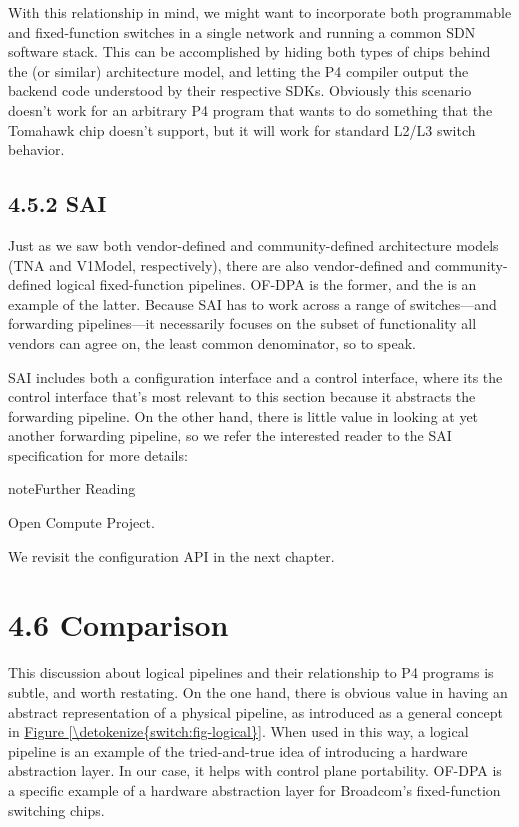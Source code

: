 \documentclass[letterpaper,11pt,english]{sphinxmanual}
\begin{document}
With this relationship in mind, we might want to incorporate both
programmable and fixed-function switches in a single network and
running a common SDN software stack. This can be accomplished by
hiding both types of chips behind the  (or similar)
architecture model, and letting the P4 compiler output the backend
code understood by their respective SDKs. Obviously this scenario
doesn’t work for an arbitrary P4 program that wants to do something
that the Tomahawk chip doesn’t support, but it will work for standard
L2/L3 switch behavior.


\subsection{4.5.2 SAI}
\label{\detokenize{switch:sai}}
Just as we saw both vendor-defined and community-defined architecture
models (TNA and V1Model, respectively), there are also vendor-defined
and community-defined logical fixed-function pipelines. OF-DPA is the
former, and the  is an example of
the latter. Because SAI has to work across a range of switches—and
forwarding pipelines—it necessarily focuses on the subset of
functionality all vendors can agree on, the least common denominator,
so to speak.

SAI includes both a configuration interface and a control interface,
where its the control interface that’s most relevant to this section
because it abstracts the forwarding pipeline. On the other hand, there
is little value in looking at yet another forwarding pipeline, so we
refer the interested reader to the SAI specification for more details:

\label{\detokenize{switch:reading-sai}}
\begin{sphinxadmonition}{note}{Further Reading}

Open Compute Project.
\end{sphinxadmonition}

We revisit the configuration API in the next chapter.


\section{4.6 Comparison}
\label{\detokenize{switch:comparison}}
This discussion about logical pipelines and their relationship to P4
programs is subtle, and worth restating. On the one hand, there is
obvious value in having an abstract representation of a physical
pipeline, as introduced as a general concept in \hyperref[\detokenize{switch:fig-logical}]{Figure \ref{\detokenize{switch:fig-logical}}}. When used in this way, a logical pipeline is an
example of the tried-and-true idea of introducing a hardware
abstraction layer. In our case, it helps with control plane
portability.  OF-DPA is a specific example of a hardware abstraction
layer for Broadcom’s fixed-function switching chips.
\end{document}
